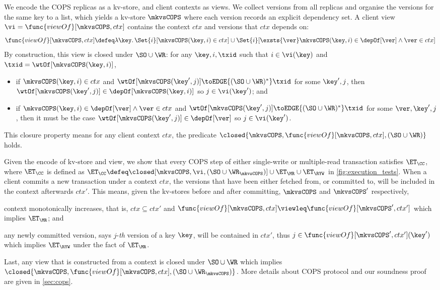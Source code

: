 We encode the COPS replicas as a kv-store, and client contexts as views.  
We collect versions from all replicas and organise the versions for the same key to a list,
which yields a kv-store \( \mkvsCOPS \) where each version records an explicit dependency set.
A client view \( \vi = \func{viewOf}[\mkvsCOPS, ctx] \) contains the context \( ctx \) and versions that \( ctx \) depends on:
\[
    \func{viewOf}[\mkvsCOPS, ctx] \defeq \lambda \key \ldotp \Set{i}[\mkvsCOPS(\key,i) \in ctx] 
                            \cup \Set{i}[\exsts{\ver} \mkvsCOPS(\key,i) \in \depOf[\ver] \land \ver \in ctx]  
\]
By construction, this view is closed under \( \SO \cup \WR \):
for any \( \key, i, \txid\) such that \( i \in \vi(\key) \) and \( \txid = \wtOf[\mkvsCOPS(\key,i)]\),
\begin{itemize}
    \item if \( \mkvsCOPS(\key,i) \in ctx \) and \( \wtOf[\mkvsCOPS(\key',j)] \toEDGE{(\SO \cup \WR)^*} \txid \) for some \( \key',j \),
        then \( \wtOf[\mkvsCOPS(\key',j)] \in \depOf[\mkvsCOPS(\key,i)] \) so \( j \in \vi(\key') \); and
    \item if \( \mkvsCOPS(\key,i) \in \depOf[\ver] \land \ver \in ctx \) and 
        \( \wtOf[\mkvsCOPS(\key',j)] \toEDGE{(\SO \cup \WR)^*} \txid \) for some \( \ver,\key',j \),
        then it must be the case \( \wtOf[\mkvsCOPS(\key',j)]  \in \depOf[\ver] \) so \( j \in \vi(\key') \).
\end{itemize}
This closure property means for any client context \( ctx \),
the predicate \( \closed{\mkvsCOPS,\func{viewOf}[\mkvsCOPS, ctx], \left( \SO \cup \WR \right)} \) holds.

Given the encode of kv-store and view, we show that every COPS step 
of either single-write or multiple-read transaction satisfies $\ET_\CC$,
where $\ET_\CC$ is defined as \( \ET_\CC \defeq \closed[\mkvsCOPS, \vi, \left( \SO \cup \WR_{\mkvsCOPS} \right)] \cup \ET_\MR \cup \ET_\RYW \) 
in \cref{fig:execution_tests}.
When a client commits a new transaction under a context \( ctx \), 
the versions that have been either fetched from, or committed to, will be included in the context afterwards \( ctx' \).
This means, given the kv-stores before and after committing, \( \mkvsCOPS \) and \( \mkvsCOPS' \) respectively,
\begin{enumerate*} 
    \item context monotonically increases, that is, 
    \( ctx \subseteq ctx' \) and \( \func{viewOf}[\mkvsCOPS, ctx] \viewleq \func{viewOf}[\mkvsCOPS', ctx']\) which implies \(\ET_\MR\);
    and 
    \item any newly committed version, says \(j\)-\emph{th} version of a key \(\key\), will be contained in \( ctx' \),
    thus \( j \in \func{viewOf}[\mkvsCOPS', ctx'](\key') \) which implies \(\ET_\RYW \) under the fact of \(\ET_\MR\).
\end{enumerate*}
Last, any view that is constructed from a context is closed under \( \SO \cup \WR \) which implies \( \closed{\mkvsCOPS,\func{viewOf}[\mkvsCOPS, ctx], \left( \SO \cup \WR_{\mkvsCOPS} \right)} \).
More details about COPS protocol and our soundness proof are given in \cref{sec:cops}.

